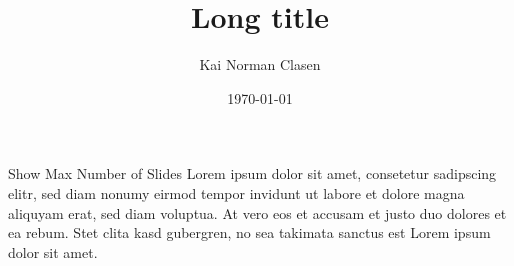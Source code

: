 \documentclass[aspectratio=169]{beamer}
\title[Show Max Number of Slides]{Long title}
\author{Kai Norman Clasen}
\institute{}
\date{\today}
\begin{document}
  \begin{frame}{Show Max Number of Slides}
    Lorem ipsum dolor sit amet, consetetur sadipscing elitr,
    sed diam nonumy eirmod tempor invidunt ut labore et dolore
    magna aliquyam erat, sed diam voluptua.
    At vero eos et accusam et justo duo dolores et ea rebum.
    Stet clita kasd gubergren, no sea takimata sanctus est
    Lorem ipsum dolor sit amet.
  \end{frame}
\end{document}
